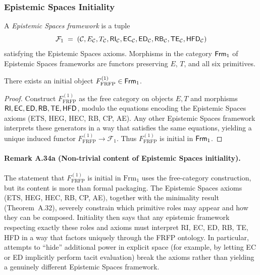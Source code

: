 \subsubsection{Epistemic Spaces Initiality}

\begin{definition}
A \emph{Epistemic Spaces framework} is a tuple
\[
\mathcal{F}_1
 \;=\;
(\mathcal{C}, E_{\mathcal{C}}, T_{\mathcal{C}},
 \mathsf{RI}_{\mathcal{C}}, \mathsf{EC}_{\mathcal{C}}, \mathsf{ED}_{\mathcal{C}},
 \mathsf{RB}_{\mathcal{C}}, \mathsf{TE}_{\mathcal{C}}, \mathsf{HFD}_{\mathcal{C}})
\]
satisfying the Epistemic Spaces axioms.
Morphisms in the category \(\mathsf{Frm}_1\) of Epistemic Spaces frameworks are functors
preserving \(E\), \(T\), and all six primitives.
\end{definition}

\begin{theorem}
\label{thm:phase1-initial}
There exists an initial object
\(F^{(1)}_{\mathrm{FRFP}} \in \mathsf{Frm}_1\).
\end{theorem}

\begin{proof}
Construct \(F^{(1)}_{\mathrm{FRFP}}\) as the free category on objects
\(E, T\) and morphisms \(\mathsf{RI},\mathsf{EC},\mathsf{ED},\mathsf{RB},\mathsf{TE},\mathsf{HFD}\), modulo the equations
encoding the Epistemic Spaces axioms (ETS, HEG, HEC, RB, CP, AE). Any other
Epistemic Spaces framework interprets these generators in a way that satisfies the
same equations, yielding a unique induced functor
\(F^{(1)}_{\mathrm{FRFP}} \to \mathcal{F}_1\). Thus
\(F^{(1)}_{\mathrm{FRFP}}\) is initial in \(\mathsf{Frm}_1\).
\end{proof}
\paragraph{Remark A.34a (Non-trivial content of Epistemic Spaces initiality).}
The statement that $F^{(1)}_{\mathrm{FRFP}}$ is initial in $\mathrm{Frm}_1$ uses the free-category
construction, but its content is more than formal packaging. The Epistemic Spaces axioms (ETS, HEG,
HEC, RB, CP, AE), together with the minimality result (Theorem~A.32), severely constrain which
primitive roles may appear and how they can be composed. Initiality then says that any epistemic
framework respecting exactly these roles and axioms must interpret RI, EC, ED, RB, TE, HFD in a
way that factors uniquely through the FRFP ontology. In particular, attempts to ``hide'' additional
power in explicit space (for example, by letting EC or ED implicitly perform tacit evaluation) break
the axioms rather than yielding a genuinely different Epistemic Spaces framework.

